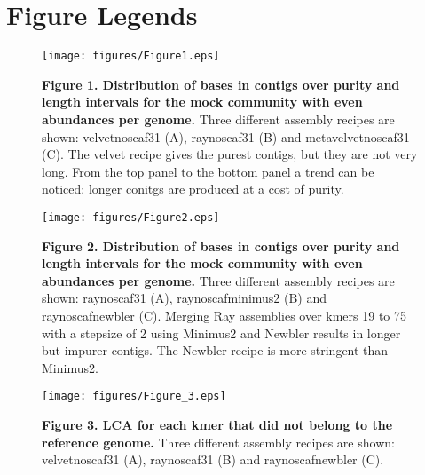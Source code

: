 \section*{Figure Legends}
%
\clearpage
\thispagestyle{empty}
\begin{figure}
\centering
\texttt{[image: figures/Figure1.eps]}
\caption{
{\bf Figure 1. Distribution of bases in contigs over purity and length
intervals for the mock community with even abundances per genome.}  Three
different assembly recipes are shown: velvetnoscaf31 (A), raynoscaf31 (B) and
metavelvetnoscaf31 (C). The velvet recipe gives the purest contigs, but they
are not very long. From the top panel to the bottom panel a trend can be
noticed: longer conitgs are produced at a cost of purity.}
\label{Figure_1}
\end{figure}

\begin{figure}
\centering
\texttt{[image: figures/Figure2.eps]}
\caption{
{\bf Figure 2. Distribution of bases in contigs over purity and length
intervals for the mock community with even abundances per genome.}  Three
different assembly recipes are shown: raynoscaf31 (A), raynoscafminimus2 (B)
and raynoscafnewbler (C). Merging Ray assemblies over kmers 19 to 75 with a
stepsize of 2 using Minimus2 and Newbler results in longer but impurer contigs.
The Newbler recipe is more stringent than Minimus2.}
\label{Figure_2}
\end{figure}

\begin{figure}
\centering
\texttt{[image: figures/Figure\_3.eps]}
\caption{
{\bf Figure 3. LCA for each kmer that did not belong to the reference genome.}
Three different assembly recipes are shown: velvetnoscaf31 (A), raynoscaf31 (B)
and raynoscafnewbler (C). }
\label{Figure_3}
\end{figure}

